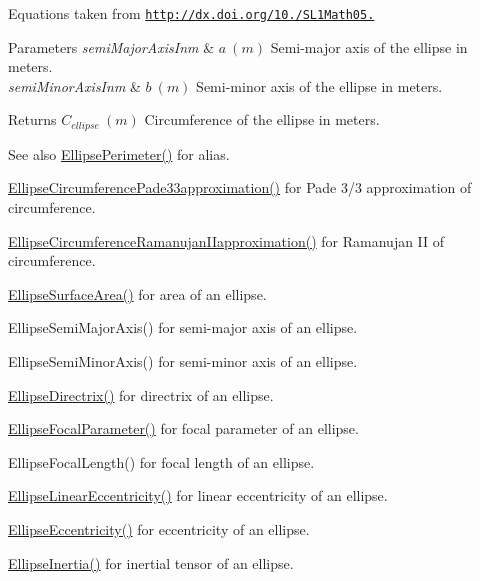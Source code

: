 Equations taken from \href{http://dx.doi.org/10.3247/SL1Math05.004}{\tt http\+://dx.\+doi.\+org/10./\+S\+L1\+Math05.} 
\begin{DoxyParams}{Parameters}
{\em semi\+Major\+Axis\+Inm} & $ a\ (m)$ Semi-\/major axis of the ellipse in meters. \\
\hline
{\em semi\+Minor\+Axis\+Inm} & $ b\ (m)$ Semi-\/minor axis of the ellipse in meters. \\
\hline
\end{DoxyParams}
\begin{DoxyReturn}{Returns}
$ C_{ellipse}\ (m)$ Circumference of the ellipse in meters. 
\end{DoxyReturn}
\begin{DoxySeeAlso}{See also}
\mbox{\hyperlink{group___e_g_x_math-_geometry-2_d-_ellipse-_circumference_ga2d4ee70e08d6fb4b56209ad4fc3f38ca}{Ellipse\+Perimeter()}} for alias. 

\mbox{\hyperlink{group___e_g_x_math-_geometry-2_d-_ellipse-_circumference_ga0e0b290f1da2605c16ec13b9e221769d}{Ellipse\+Circumference\+Pade33approximation()}} for Pade 3/3 approximation of circumference. 

\mbox{\hyperlink{group___e_g_x_math-_geometry-2_d-_ellipse-_circumference_gaa908406db81fadc7c2d73e4e113d24d7}{Ellipse\+Circumference\+Ramanujan\+I\+Iapproximation()}} for Ramanujan II of circumference. 

\mbox{\hyperlink{group___e_g_x_math-_geometry-2_d-_ellipse-_surface_area_ga4ce8c8323e9718ce5458f4ab7f6d823d}{Ellipse\+Surface\+Area()}} for area of an ellipse. 

Ellipse\+Semi\+Major\+Axis() for semi-\/major axis of an ellipse. 

Ellipse\+Semi\+Minor\+Axis() for semi-\/minor axis of an ellipse. 

\mbox{\hyperlink{group___e_g_x_math-_geometry-2_d-_ellipse-_directrix_gace8f72a8efbc9c18d3eb689151405106}{Ellipse\+Directrix()}} for directrix of an ellipse. 

\mbox{\hyperlink{group___e_g_x_math-_geometry-2_d-_ellipse-_focal_parameter_ga4cd01a38c72c092ef9791351948bf69b}{Ellipse\+Focal\+Parameter()}} for focal parameter of an ellipse. 

Ellipse\+Focal\+Length() for focal length of an ellipse. 

\mbox{\hyperlink{group___e_g_x_math-_geometry-2_d-_ellipse-_linear_eccentricity_gac70b3010e30aa8b73deb50fe2b9b9a91}{Ellipse\+Linear\+Eccentricity()}} for linear eccentricity of an ellipse. 

\mbox{\hyperlink{group___e_g_x_math-_geometry-2_d-_ellipse-_eccentricity_ga6a0a7fba17f782616894cfc447628c33}{Ellipse\+Eccentricity()}} for eccentricity of an ellipse. 

\mbox{\hyperlink{group___e_g_x_math-_geometry-2_d-_ellipse-_inertia_ga10a3049c2f04b50f271fb01dc62e4cf8}{Ellipse\+Inertia()}} for inertial tensor of an ellipse. 
\end{DoxySeeAlso}
